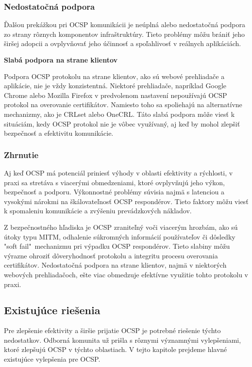 \documentclass[12pt, twoside]{book}
\newcommand{\subsubsubsection}[1]{%
  \vspace{0.2em}  
  \textbf{#1} \\[0.2em]
  \hspace*{\parindent}
}
\begin{document}
\subsubsection{Nedostatočná podpora}
Ďalšou prekážkou pri OCSP komunikácii je neúplná alebo nedostatočná podpora zo strany rôznych komponentov infraštruktúry. Tieto problémy môžu brániť jeho širšej adopcii a ovplyvňovať jeho účinnosť a spoľahlivosť v reálnych aplikáciách.


\subsubsubsection{Slabá podpora na strane klientov}
Podpora OCSP protokolu na strane klientov, ako sú webové prehliadače a aplikácie, nie je vždy konzistentná. Niektoré prehliadače, napríklad Google Chrome alebo Mozilla  Firefox v predvolenom nastavení nepoužívajú OCSP protokol na overovanie certifikátov. Namiesto toho sa spoliehajú na alternatívne mechanizmy, ako je CRLset alebo OneCRL.\cite{turin} Táto slabá podpora môže viesť k situáciám, kedy OCSP protokol nie je vôbec využívaný, aj keď by mohol zlepšiť bezpečnosť a efektivitu komunikácie.


\subsubsection{Zhrnutie}
Aj keď OCSP má potenciál priniesť výhody v oblasti efektivity a rýchlosti, v praxi sa stretáva s viacerými obmedzeniami, ktoré ovplyvňujú jeho výkon, bezpečnosť a podporu. Výkonnostné problémy súvisia najmä s latenciou a vysokými nárokmi na škálovateľnosť OCSP respondérov. Tieto faktory môžu viesť k spomaleniu komunikácie a zvýšeniu prevádzkových nákladov.

Z bezpečnostného hľadiska je OCSP zraniteľný voči viacerým hrozbám, ako sú útoky typu MITM, odhalenie súkromných informácií používateľov či dôsledky "soft fail"\ mechanizmu pri výpadku OCSP respondérov. Tieto slabiny môžu výrazne ohroziť dôveryhodnosť protokolu a integritu procesu overovania certifikátov. Nedostatočná podpora na strane klientov, najmä v niektorých webových prehliadačoch, ešte viac obmedzuje efektívne využitie tohto protokolu v praxi.


\subsection{Existujúce riešenia}
Pre zlepšenie efektivity a širšie prijatie OCSP je potrebné riešenie týchto nedostatkov. Odborná komunita už prišla s rôznymi významnými vylepšeniami, ktoré zlepšujú OCSP v týchto oblastiach. V tejto kapitole prejdeme hlavné existujúce vylepšenia pre OCSP.
\end{document}
